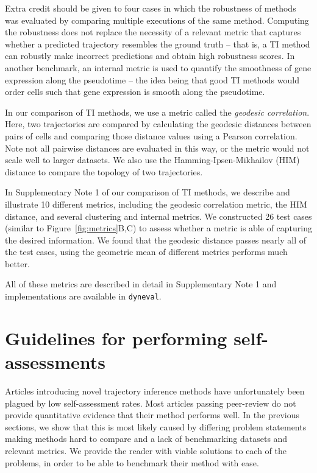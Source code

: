 Extra credit should be given to four cases in which the robustness of methods was evaluated by comparing multiple executions of the same method\cite{haghverdi_diffusionpseudotimerobustly_2016,cannoodt_scorpiusimprovestrajectory_2016,_doesyourcode_2018,sharma_forksfindingorderings_2017,jin_scepathenergylandscapebased_2018}. Computing the robustness does not replace the necessity of a relevant metric that captures whether a predicted trajectory resembles the ground truth -- that is, a TI method can robustly make incorrect predictions and obtain high robustness scores.
In another benchmark, an internal metric is used to quantify the smoothness of gene expression along the pseudotime \cite{darocha_reconstructioncomplexsinglecell_2018} -- the idea being that good TI methods would order cells such that gene expression is smooth along the pseudotime.


In our comparison of TI methods\cite{saelens_comparisonsinglecelltrajectory_2019}, we use a metric called the \emph{geodesic correlation}. Here, two trajectories are compared by calculating the geodesic distances between pairs of cells and comparing those distance values using a Pearson correlation. Note not all pairwise distances are evaluated in this way, or the metric would not scale well to larger datasets. We also use the Hamming-Ipsen-Mikhailov (HIM) distance\cite{jurman_himglocalmetric_2015} to compare the topology of two trajectories. 

In Supplementary Note 1 of our comparison of TI methods, we describe and illustrate 10 different metrics, including the geodesic correlation metric, the HIM distance, and several clustering and internal metrics. We constructed 26 test cases (similar to Figure~\ref{fig:metrics}B,C) to assess whether a metric is able of capturing the desired information. We found that the geodesic distance passes nearly all of the test cases, using the geometric mean of different metrics performs much better.

All of these metrics are described in detail in Supplementary Note 1 and implementations are available in \texttt{dyneval}\cite{dyno}. 

\section{Guidelines for performing self-assessments}
Articles introducing novel trajectory inference methods have unfortunately been plagued by low self-assessment rates. Most articles passing peer-review do not provide quantitative evidence that their method performs well. In the previous sections, we show that this is most likely caused by differing problem statements making methods hard to compare and a lack of benchmarking datasets and relevant metrics. We provide the reader with viable solutions to each of the problems, in order to be able to benchmark their method with ease.


